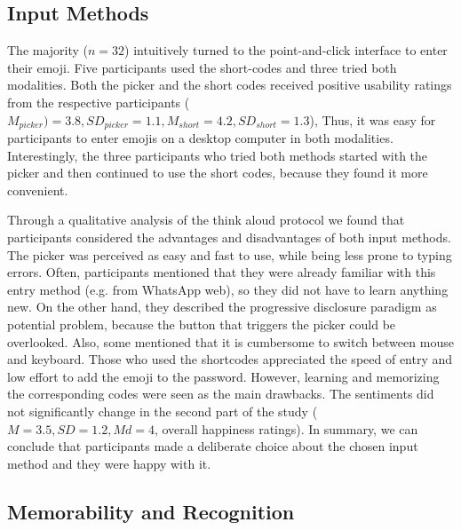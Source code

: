 \subsection{Input Methods}
The majority ($n=32$) intuitively turned to the point-and-click interface to enter their emoji. Five participants used the short-codes and three tried both modalities. Both the picker and the short codes received positive usability ratings from the respective participants ($M_{picker})=3.8, SD_{picker}=1.1, M_{short}=4.2, SD_{short}=1.3$),  Thus, it was easy for participants to enter emojis on a desktop computer in both modalities. Interestingly, the three participants who tried both methods started with the picker and then continued to use the short codes, because they found it more convenient.

Through a qualitative analysis of the think aloud protocol we found that participants considered the advantages and disadvantages of both input methods. The picker was perceived as easy and fast to use, while being less prone to typing errors. Often, participants mentioned that they were already familiar with this entry method (e.g. from WhatsApp web), so they did not have to learn anything new. On the other hand, they described the progressive disclosure paradigm as potential problem, because the button that triggers the picker could be overlooked. Also, some mentioned that it is cumbersome to switch between mouse and keyboard. Those who used the shortcodes appreciated the speed of entry and low effort to add the emoji to the password. However, learning and memorizing the corresponding codes were seen as the main drawbacks. The sentiments did not significantly change in the second part of the study ($M=3.5, SD=1.2, Md=4$, overall happiness ratings). In summary, we can conclude that participants made a deliberate choice about the chosen input method and they were happy with it. %

\subsection{Memorability and Recognition}
